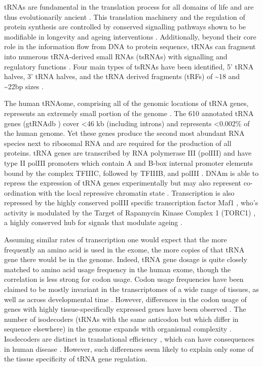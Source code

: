 \documentclass[
]{book}
\begin{document}
tRNAs are fundamental in the translation process for all domains of life and are thus evolutionarily ancient \citep{Eigen1989}.
This translation machinery and the regulation of protein synthesis are controlled by conserved signalling pathways shown to be modifiable in longevity and ageing interventions \citep{Tavernarakis2008}.
Additionally, beyond their core role in the information flow from DNA to protein sequence, tRNAs can fragment into numerous tRNA-derived small RNAs (tsRNAs) \citep{Pliatsika2018} with signalling and regulatory functions \citep{Schimmel2017, Lee2009}.
Four main types of tsRNAs have been identified, 5' tRNA halves, 3' tRNA halves, and the tRNA derived fragments (tRFs) of \textasciitilde18 and \textasciitilde22bp sizes \citep{Torres2019, Li2018a, Xu2017a}.

The human tRNAome, comprising all of the genomic locations of tRNA genes, represents an extremely small portion of the genome \citep{Parisien2013}.
The 610 annotated tRNA genes (gtRNAdb \citep{Chan2009}) cover \textless46 kb (including introns) and represents \textless0.002\% of the human genome.
Yet these genes produce the second most abundant RNA species next to ribosomal RNA \citep{Lodish2000} and are required for the production of all proteins.
tRNA genes are transcribed by RNA polymerase III (polIII) \citep{Schramm2002} and have type II polIII promoters which contain A and B-box internal promoter elements bound by the complex TFIIIC, followed by TFIIIB, and polIII \citep{Canella2010}.
DNAm is able to repress the expression of tRNA genes experimentally \citep{Besser1990} but may also represent co-ordination with the local repressive chromatin state \citep{Varshney2015}.
Transcription is also repressed by the highly conserved polIII specific transcription factor Maf1 \citep{Murawski1994, Pluta2001}, who's activity is modulated by the Target of Rapamycin Kinase Complex 1 (TORC1) \citep{Mange2017}, a highly conserved hub for signals that modulate ageing \citep{Kennedy2016}.

Assuming similar rates of transcription one would expect that the more frequently an amino acid is used in the exome, the more copies of that tRNA gene there would be in the genome.
Indeed, tRNA gene dosage is quite closely matched to amino acid usage frequency in the human exome, though the correlation is less strong for codon usage.
Codon usage frequencies have been claimed to be mostly invariant in the transcriptomes of a wide range of tissues, as well as across developmental time \citep{Schmitt2014}.
However, differences in the codon usage of genes with highly tissue-specifically expressed genes have been observed \citep{Powell1997}.
The number of isodecoders (tRNAs with the same anticodon but which differ in sequence elsewhere) in the genome expands with organismal complexity \citep{Goodenbour2006}.
Isodecoders are distinct in translational efficiency \citep{Geslain2010}, which can have consequences in human disease \citep{Kirchner2017}.
However, such differences seem likely to explain only some of the tissue specificity of tRNA gene regulation.
\end{document}
